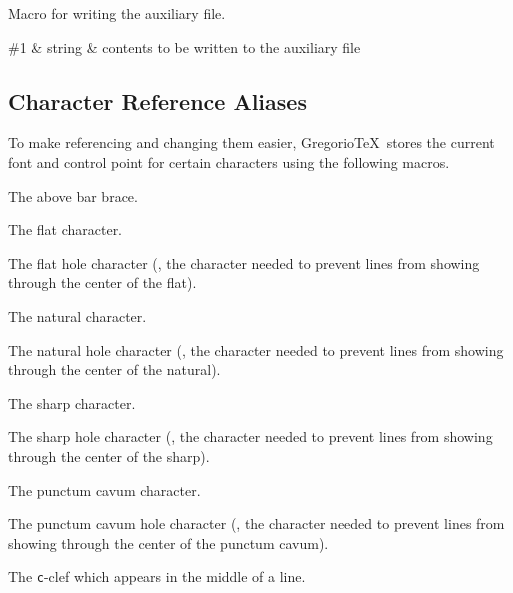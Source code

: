 Macro for writing the auxiliary file.

\begin{argtable}
  \#1 & string & contents to be written to the auxiliary file\\
\end{argtable}



\subsection{Character Reference Aliases}
To make referencing and changing them easier, Gregorio\TeX\ stores the current font and control point for certain characters using the following macros.

The above bar brace.

The flat character.

The flat hole character (\ie, the character needed to prevent lines from showing through the center of the flat).

The natural character.

The natural hole character (\ie, the character needed to prevent lines from showing through the center of the natural).

The sharp character.

The sharp hole character (\ie, the character needed to prevent lines from showing through the center of the sharp).

The punctum cavum character.

The punctum cavum hole character (\ie, the character needed to prevent lines from showing through the center of the punctum cavum).

The \texttt{c}-clef which appears in the middle of a line.

